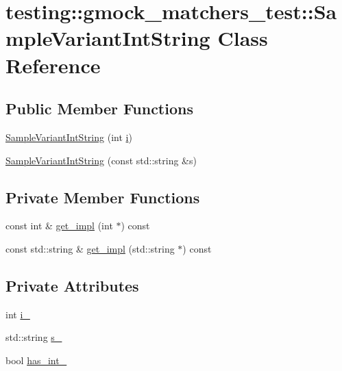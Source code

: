 \hypertarget{classtesting_1_1gmock__matchers__test_1_1_sample_variant_int_string}{}\section{testing\+::gmock\+\_\+matchers\+\_\+test\+::Sample\+Variant\+Int\+String Class Reference}
\label{classtesting_1_1gmock__matchers__test_1_1_sample_variant_int_string}
\subsection*{Public Member Functions}
\begin{DoxyCompactItemize}
\item 
\mbox{\hyperlink{classtesting_1_1gmock__matchers__test_1_1_sample_variant_int_string_a362f135d65f8dd024202cc4908b510e2}{Sample\+Variant\+Int\+String}} (int \mbox{\hyperlink{_obj__test_2lib_2googletest-master_2googlemock_2test_2gmock-matchers__test_8cc_acb559820d9ca11295b4500f179ef6392}{i}})
\item 
\mbox{\hyperlink{classtesting_1_1gmock__matchers__test_1_1_sample_variant_int_string_a2cca84a8b8af0726efab2b28df5e2880}{Sample\+Variant\+Int\+String}} (const std\+::string \&s)
\end{DoxyCompactItemize}
\subsection*{Private Member Functions}
\begin{DoxyCompactItemize}
\item 
const int \& \mbox{\hyperlink{classtesting_1_1gmock__matchers__test_1_1_sample_variant_int_string_a1bc42dad7d25d6a16a44ebe60f408dad}{get\+\_\+impl}} (int $\ast$) const
\item 
const std\+::string \& \mbox{\hyperlink{classtesting_1_1gmock__matchers__test_1_1_sample_variant_int_string_a0335d4fd29ef3736dee76df8ac6370d1}{get\+\_\+impl}} (std\+::string $\ast$) const
\end{DoxyCompactItemize}
\subsection*{Private Attributes}
\begin{DoxyCompactItemize}
\item 
int \mbox{\hyperlink{classtesting_1_1gmock__matchers__test_1_1_sample_variant_int_string_ae732bd3a3fbd695ce767a5641db1b85b}{i\+\_\+}}
\item 
std\+::string \mbox{\hyperlink{classtesting_1_1gmock__matchers__test_1_1_sample_variant_int_string_a0c5a6109142e79a646654be797287328}{s\+\_\+}}
\item 
bool \mbox{\hyperlink{classtesting_1_1gmock__matchers__test_1_1_sample_variant_int_string_ad739edcbd4683b0098e7ad93031270da}{has\+\_\+int\+\_\+}}
\end{DoxyCompactItemize}
